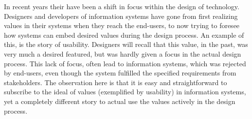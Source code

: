 In recent years their have been a shift in focus within the design of technology. Designers and developers of information systems have gone from first realizing values in their systems when they reach the end-users, to now trying to foresee how systems can embed desired values during the design process.
An example of this, is the story of usability. Designers will recall that this value, in the past, was very much a desired featured, but was hardly given a focus in the actual design process. This lack of focus, often lead to information systems, which was rejected by end-users, even though the system fulfilled the specified requirements from stakeholders.\newline
The observation here is that it is easy and straightforward to subscribe to the ideal of values (exemplified by usability) in information systems, yet a completely different story to actual use the values actively in the design process.





